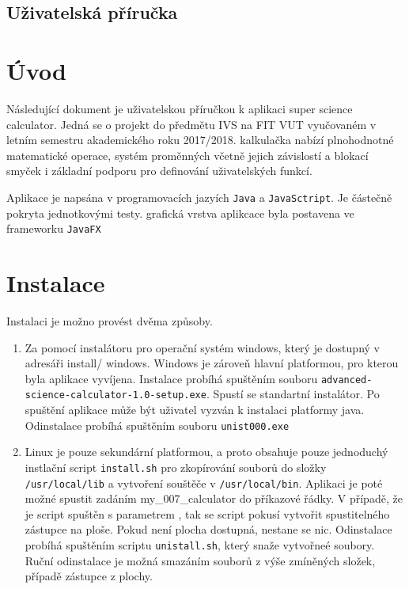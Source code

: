 \documentclass[11pt, a4paper, titlepage]{article}
\begin{document}
	
	\pagestyle{fancy}

	\begin{center}
		\section*{Uživatelská příručka}
	\end{center}

	\tableofcontents

	\section{Úvod}
	Následující dokument je uživatelskou příručkou k aplikaci super science calculator. Jedná se o projekt do
	předmětu IVS na FIT VUT vyučovaném v letním semestru akademického roku 2017/2018. kalkulačka nabízí 
	plnohodnotné matematické operace, systém proměnných včetně jejich závislostí a blokací smyček i základní podporu
	pro definování uživatelských funkcí.

	Aplikace je napsána v programovacích jazyích \texttt{Java} a \texttt{JavaSctript}. Je částečně pokryta jednotkovými testy.
	grafická vrstva aplikcace byla postavena ve frameworku \texttt{JavaFX}

	\section{Instalace}

	Instalaci je možno provést dvěma způsoby.

	\begin{enumerate}
		\item Za pomocí instalátoru pro operační systém windows, který je dostupný v adresáři install/ windows.
		Windows je zároveň hlavní platformou, pro kterou byla aplikace vyvíjena. Instalace probíhá spuštěním
		souboru \texttt{advanced-science-calculator-1.0-setup.exe}. Spustí se standartní instalátor.
		Po spuštění aplikace může být uživatel vyzván k instalaci platformy java. 
		Odinstalace probíhá spuštěním souboru \texttt{unist000.exe}

		\item Linux je pouze sekundární platformou, a proto obsahuje pouze jednoduchý instlační script \texttt{install.sh}
		pro zkopírování souborů do složky \texttt{/usr/local/lib} a vytvoření souštěče v \texttt{/usr/local/bin}.
		Aplikaci je poté možné spustit zadáním my\_007\_calculator do příkazové řádky.
		V případě, že je script spuštěn s parametrem , tak se script pokusí vytvořit spustitelného
		zástupce na ploše. Pokud není plocha dostupná, nestane se nic.
		Odinstalace probíhá spuštěním scriptu \texttt{unistall.sh}, který snaže vytvořneé soubory. Ruční odinstalace je možná
		smazáním souborů z výše zmíněných složek, případě zástupce z plochy.
	\end{enumerate}
\end{document}
